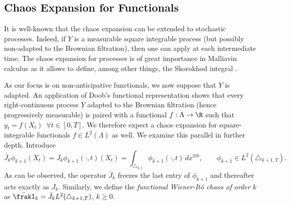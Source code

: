 \subsection{Chaos Expansion for Functionals}

It is well-known that the chaos expansion can be extended to stochastic processes. Indeed, if $Y $ %
is a measurable square integrable process (but possibly non-adapted to the Brownian filtration), then one can apply   at each intermediate time. %
The chaos expansion for processes is of great importance in Malliavin calculus as it allows to define, among other things, the Skorokhod integral \cite{Skorokhod}. 

As our focus is on non-anticipative functionals, we now suppose that $Y$ is adapted.  %
An application of Doob's functional representation \cite[Lemma 1.13.]{kallenberg} shows that every  right-continuous process $Y$ adapted to the Brownian filtration (hence progressively measurable) 
is paired with a functional $f:\Lambda \to \R$ such that $y_t=f(X_t)\,$ $\forall t \in [0,T]$. We therefore expect a chaos expansion for square-integrable functionals $f\in L^2(\Lambda)$ as well.  
We examine this parallel in further depth. 
Introduce
\begin{equation} \label{eq:shiftChaos}
    \bar{J}_k\phi_{k+1}(X_t)= J_k\phi_{k+1}(\cdot,t)(X_t) =\int_{\triangle_{k,t}} \phi_{k+1}(\cdot, t)\, dx^{\otimes k}, \qquad \phi_{k+1} \in L^2(\triangle_{k+1,T}).
\end{equation}
As can be observed, the operator $\bar{J}_k$ freezes the last entry of  $\phi_{k+1}$ and thereafter acts exactly  as $J_k$. Similarly, we define the \textit{functional Wiener-Itô chaos of order $k$}  as  $\bar{\frakI}_k = \bar{J}_kL^2(\triangle_{k+1,T})$, $k \ge 0$. %

